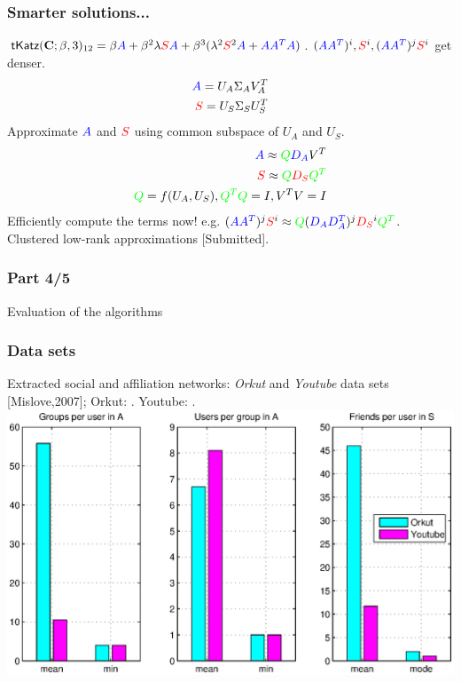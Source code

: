 \documentclass[handout]{beamer}
\begin{document}
\begin{frame}
\frametitle{Smarter solutions...}
\begin{itemize}
\pitem $\textsf{tKatz}(\mathbf{C};\beta,3)_{12} = \beta \textcolor{blue}{A} + \beta^2 \lambda \textcolor{red}{S} \textcolor{blue}{A} +  \beta^3(\lambda^2 \textcolor{red}{S}^2 \textcolor{blue}{A} + \textcolor{blue}{A} \textcolor{blue}{A^T} \textcolor{blue}{A})$.
\pitem $(\textcolor{blue}{A}\textcolor{blue}{A^{T}})^i, \textcolor{red}{S}^{i}, (\textcolor{blue}{A}\textcolor{blue}{A^{T}})^{j}\textcolor{red}{S}^{i}$ get denser.
\pause
\begin{align*}
\textcolor{blue}{A} = U_{A} \Sigma_{A} V_{A}^{T}\\
\textcolor{red}{S} = U_{S} \Sigma_{S} U_{S}^{T}
\end{align*}
\pitem Approximate $\textcolor{blue}{A}$ and $\textcolor{red}{S}$ using common subspace of $U_{A}$ and $U_{S}$.
\pause
\begin{align*}
\textcolor{blue}{A} \approx \textcolor{green}{Q} \textcolor{blue}{D_{A}}V^{T} \\
\textcolor{red}{S} \approx \textcolor{green}{Q} \textcolor{red}{D_{S}} \textcolor{green}{Q^{T}}\\
\textcolor{green}{Q} = f(U_{A}, U_{S}), \textcolor{green}{Q^{T}}\textcolor{green}{Q} = I, V^{T}V = I
\end{align*}
\pitem Efficiently compute the terms now! e.g. $(\textcolor{blue}{A}\textcolor{blue}{A^{T}})^j\textcolor{red}{S}^{i} \approx \textcolor{green}{Q}(\textcolor{blue}{D_A}\textcolor{blue}{D_A^{T}})^{j}\textcolor{red}{D_{S}}^{i} \textcolor{green}{Q^T}$.
\pitem Clustered low-rank approximations [Submitted].
\end{itemize}
\end{frame}

\begin{frame}
\frametitle{Part 4/5}
  \hspace{1.1in}
  \centerline{\huge{Evaluation of the algorithms}}
\end{frame}

\begin{frame}
\frametitle{Data sets}
Extracted social and affiliation networks: \emph{Orkut} and \emph{Youtube} data sets [Mislove,2007]; Orkut: . Youtube: .
\includegraphics[scale=0.5]{../talk/figures/stats.eps}
\end{frame}
\end{document}

